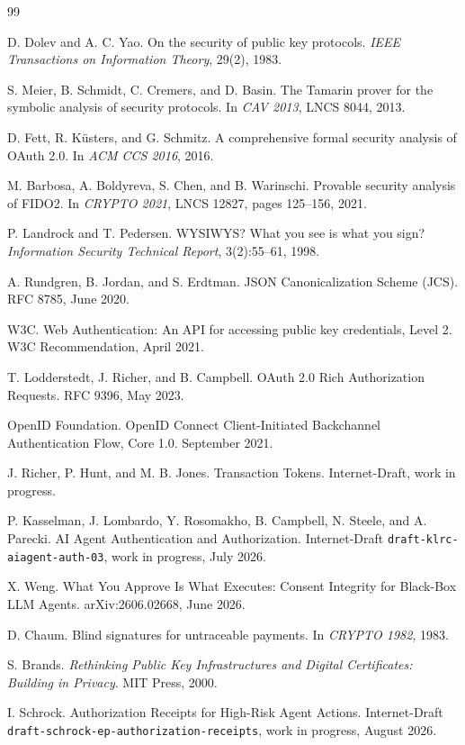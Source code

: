 \documentclass[10.5pt]{article}
\newcommand{\code}[1]{\texttt{#1}}
\begin{document}
\begin{thebibliography}{99}

D. Dolev and A. C. Yao.
On the security of public key protocols.
\emph{IEEE Transactions on Information Theory}, 29(2), 1983.

S. Meier, B. Schmidt, C. Cremers, and D. Basin.
The Tamarin prover for the symbolic analysis of security protocols.
In \emph{CAV 2013}, LNCS 8044, 2013.

D. Fett, R. K\"usters, and G. Schmitz.
A comprehensive formal security analysis of OAuth 2.0.
In \emph{ACM CCS 2016}, 2016.

M. Barbosa, A. Boldyreva, S. Chen, and B. Warinschi.
Provable security analysis of FIDO2.
In \emph{CRYPTO 2021}, LNCS 12827, pages 125--156, 2021.

P. Landrock and T. Pedersen.
WYSIWYS? What you see is what you sign?
\emph{Information Security Technical Report}, 3(2):55--61, 1998.

A. Rundgren, B. Jordan, and S. Erdtman.
JSON Canonicalization Scheme (JCS).
RFC 8785, June 2020.

W3C.
Web Authentication: An API for accessing public key credentials, Level 2.
W3C Recommendation, April 2021.

T. Lodderstedt, J. Richer, and B. Campbell.
OAuth 2.0 Rich Authorization Requests.
RFC 9396, May 2023.

OpenID Foundation.
OpenID Connect Client-Initiated Backchannel Authentication Flow, Core 1.0.
September 2021.

J. Richer, P. Hunt, and M. B. Jones.
Transaction Tokens.
Internet-Draft, work in progress.

P. Kasselman, J. Lombardo, Y. Rosomakho, B. Campbell, N. Steele, and A. Parecki.
AI Agent Authentication and Authorization.
Internet-Draft \code{draft-klrc-aiagent-auth-03}, work in progress, July 2026.

X. Weng.
What You Approve Is What Executes: Consent Integrity for Black-Box LLM Agents.
arXiv:2606.02668, June 2026.

D. Chaum.
Blind signatures for untraceable payments.
In \emph{CRYPTO 1982}, 1983.

S. Brands.
\emph{Rethinking Public Key Infrastructures and Digital Certificates: Building
in Privacy}.
MIT Press, 2000.

I. Schrock.
Authorization Receipts for High-Risk Agent Actions.
Internet-Draft \code{draft-schrock-ep-authorization-receipts}, work in progress,
August 2026.

\end{thebibliography}
\end{document}
